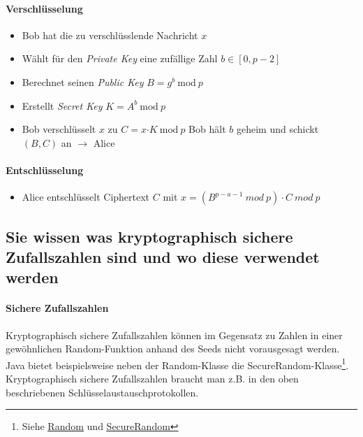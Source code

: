 \documentclass[10pt,a4paper]{article}
\begin{document}
\pagebreak
\paragraph*{Verschlüsselung}
\begin{itemize}[noitemsep,topsep=0pt,leftmargin=*]
    \item Bob hat die zu verschlüsslende Nachricht {\color{red}$x$}
    \item Wählt für den \textsl{Private Key} eine {\color{dunkelblau}zufällige Zahl $b\in[0,p-2]$}
    \item Berechnet seinen \textsl{Public Key} {\color{dunkelblau}$B=g^b\ \mathrm{mod}\ p$} %
    \item Erstellt \textsl{Secret Key} {\color{dunkelblau}$K=A^b\ \mathrm{mod}\ p$}
    \item Bob verschlüsselt {\color{red}$x$} zu {\color{dunkelblau}$C= ${\color{red}$x$}$\cdot K\ \mathrm{mod}\ p$}
    \subitem Bob hält {\color{dunkelblau}$b$ geheim} und schickt $(B, C)$ an $\rightarrow$ Alice
\end{itemize}

\paragraph*{Entschlüsselung}
\begin{itemize}[noitemsep,topsep=0pt,leftmargin=*]
    \item Alice entschlüsselt Ciphertext $C$ mit {\color{dunkelblau}$x=(B^{p-a-1}\ mod\ p)\cdot C\ mod\ p$}
\end{itemize}


\subsection*{Sie wissen was kryptographisch sichere Zufallszahlen sind und wo diese verwendet werden}
\paragraph*{Sichere Zufallszahlen}Kryptographisch sichere Zufallszahlen können im Gegensatz zu Zahlen in einer gewöhnlichen Random-Funktion anhand des Seeds nicht vorausgesagt werden. Java bietet beispielsweise neben der Random-Klasse die SecureRandom-Klasse\footnote{Siehe \underline{\href{https://docs.oracle.com/javase/8/docs/api/java/util/Random.html}{Random}} und \underline{\href{https://docs.oracle.com/javase/8/docs/api/java/security/SecureRandom.html}{SecureRandom}}}. Kryptographisch sichere Zufallszahlen braucht man z.B. in den oben beschriebenen Schlüsselaustauschprotokollen.
\end{document}
